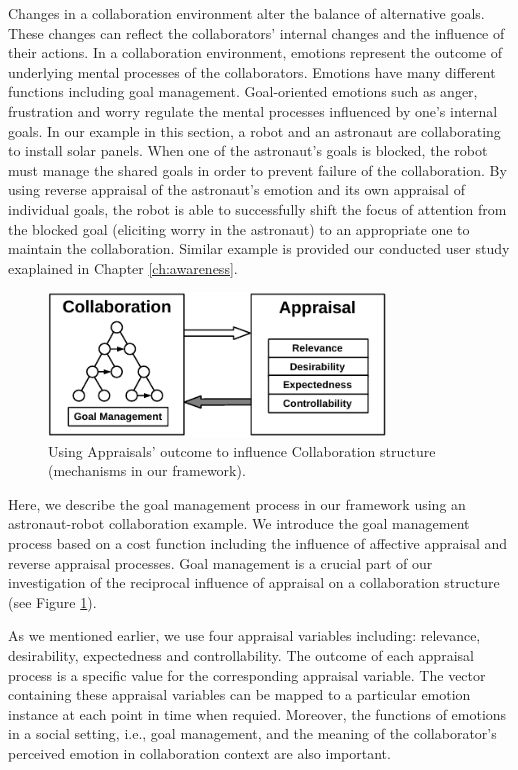 \documentclass[12pt]{report}
\begin{document}
Changes in a collaboration environment alter the balance of alternative goals.
These changes can reflect the collaborators' internal changes and the influence
of their actions. In a collaboration environment, emotions represent the outcome
of underlying mental processes of the collaborators. Emotions have many
different functions \cite{scheutz:architectural-action-selection} including
goal management. Goal-oriented emotions such as anger, frustration and
worry regulate the mental processes influenced by one's internal goals. In our
example in this section, a robot and an astronaut are collaborating to install
solar panels. When one of the astronaut's goals is blocked, the robot must
manage the shared goals in order to prevent failure of the collaboration. By
using reverse appraisal \cite{gratch:reverse-appraisal} of the astronaut's
emotion and its own appraisal of individual goals, the robot is able to
successfully shift the focus of attention from the blocked goal (eliciting worry
in the astronaut) to an appropriate one to maintain the collaboration. Similar
example is provided our conducted user study exaplained in Chapter
\ref{ch:awareness}.

\begin{figure}[t]
  \centering
  \includegraphics[width=0.8\textwidth]{figure/goal_management_croped.pdf}
  \caption{Using Appraisals' outcome to influence Collaboration structure
  (mechanisms in our framework).}
  \label{fig:appraisal-on-collaboration}
\end{figure}

Here, we describe the goal management process in our framework using an
astronaut-robot collaboration example. We introduce the goal management process
based on a cost function including the influence of affective appraisal and
reverse appraisal processes. Goal management is a crucial part of our
investigation of the reciprocal influence of appraisal on a collaboration
structure (see Figure \ref{fig:appraisal-on-collaboration}).

As we mentioned earlier, we use four appraisal variables including: relevance,
desirability, expectedness and controllability. The outcome of each appraisal
process is a specific value for the corresponding appraisal variable. The vector
containing these appraisal variables can be mapped to a particular emotion
instance at each point in time when requied. Moreover, the functions of emotions
in a social setting, i.e., goal management, and the meaning of the
collaborator's perceived emotion in collaboration context are also important.
\end{document}
